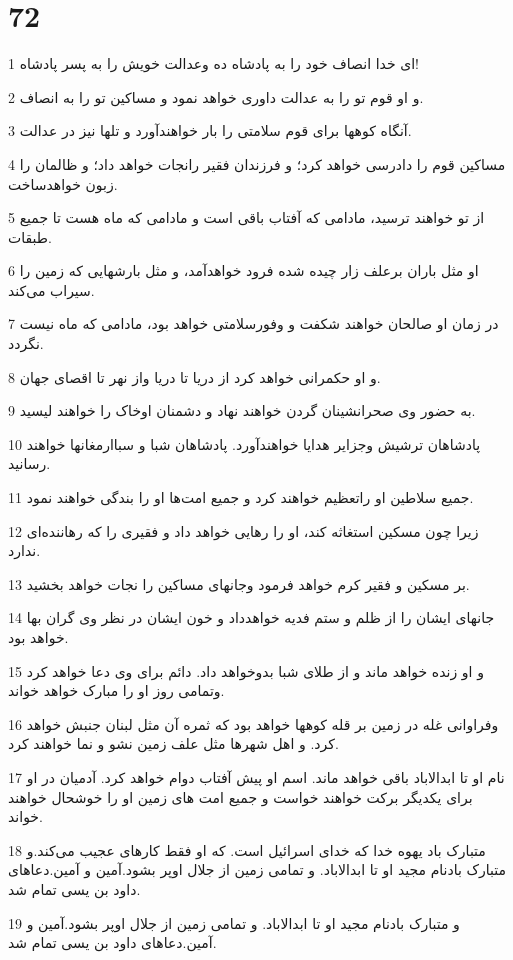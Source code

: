 \chapter{72}

\par 1 ای خدا انصاف خود را به پادشاه ده وعدالت خویش را به پسر پادشاه!
\par 2 و او قوم تو را به عدالت داوری خواهد نمود و مساکین تو را به انصاف.
\par 3 آنگاه کوهها برای قوم سلامتی را بار خواهند‌آورد و تلها نیز در عدالت.
\par 4 مساکین قوم را دادرسی خواهد کرد؛ و فرزندان فقیر رانجات خواهد داد؛ و ظالمان را زبون خواهدساخت.
\par 5 از تو خواهند ترسید، مادامی که آفتاب باقی است و مادامی که ماه هست تا جمیع طبقات.
\par 6 او مثل باران برعلف زار چیده شده فرود خواهدآمد، و مثل بارشهایی که زمین را سیراب می‌کند.
\par 7 در زمان او صالحان خواهند شکفت و وفورسلامتی خواهد بود، مادامی که ماه نیست نگردد.
\par 8 و او حکمرانی خواهد کرد از دریا تا دریا واز نهر تا اقصای جهان.
\par 9 به حضور وی صحرانشینان گردن خواهند نهاد و دشمنان اوخاک را خواهند لیسید.
\par 10 پادشاهان ترشیش وجزایر هدایا خواهند‌آورد. پادشاهان شبا و سباارمغانها خواهند رسانید.
\par 11 جمیع سلاطین او راتعظیم خواهند کرد و جمیع امت‌ها او را بندگی خواهند نمود.
\par 12 زیرا چون مسکین استغاثه کند، او را رهایی خواهد داد و فقیری را که رهاننده‌ای ندارد.
\par 13 بر مسکین و فقیر کرم خواهد فرمود وجانهای مساکین را نجات خواهد بخشید.
\par 14 جانهای ایشان را از ظلم و ستم فدیه خواهدداد و خون ایشان در نظر وی گران بها خواهد بود. 
\par 15 و او زنده خواهد ماند و از طلای شبا بدوخواهد داد. دائم برای وی دعا خواهد کرد وتمامی روز او را مبارک خواهد خواند.
\par 16 وفراوانی غله در زمین بر قله کوهها خواهد بود که ثمره آن مثل لبنان جنبش خواهد کرد. و اهل شهرها مثل علف زمین نشو و نما خواهند کرد.
\par 17 نام او تا ابدالاباد باقی خواهد ماند. اسم او پیش آفتاب دوام خواهد کرد. آدمیان در او برای یکدیگر برکت خواهند خواست و جمیع امت های زمین او را خوشحال خواهند خواند.
\par 18 متبارک باد یهوه خدا که خدای اسرائیل است. که او فقط کارهای عجیب می‌کند.و متبارک بادنام مجید او تا ابدالاباد. و تمامی زمین از جلال اوپر بشود.آمین و آمین.دعاهای داود بن یسی تمام شد.
\par 19 و متبارک بادنام مجید او تا ابدالاباد. و تمامی زمین از جلال اوپر بشود.آمین و آمین.دعاهای داود بن یسی تمام شد.
 
